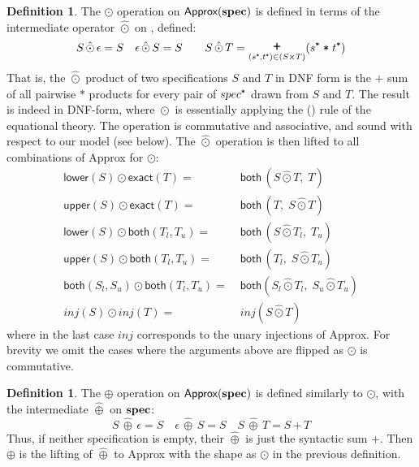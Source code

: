 \documentclass[10pt,preprint,numbers]{sigplanconf}
\newcounter{block}
\theoremstyle{definition}
\newtheorem{definition}[block]{Definition}
\newcommand{\term}[1]{\texttt{#1}}
\newcommand{\trule}[1]{{\footnotesize{(\text{#1})}}}
\begin{document}
\begin{definition} The $\odot$ operation on $\textsf{Approx}(\textbf{spec}{})$
  is defined in terms of the intermediate operator $\hat{\odot}$ on
  \specDNF{}, defined:
\begin{align*}
S \,\hat{\odot}\, \epsilon = S \quad
\epsilon \,\hat{\odot}\, S = S \qquad
S \,\hat{\odot}\, T = \bplus_{(\tyProd{s}, \tyProd{t}) \in (S \times
   T)} (\tyProd{s} \; \term{*} \; \tyProd{t})
\end{align*}
That is, the $\hat{\odot}$ product of two specifications $S$ and $T$ in DNF form
is the $\term{+}$ sum of all pairwise $\term{*}$ products for every
pair of $\tyProd{spec}$ drawn from $S$ and $T$. The result
is indeed in DNF-form, where $\hat{\odot}$ is essentially applying
 the \trule{\textsc{dist}} rule of the equational theory. The operation is
commutative and associative, and sound with respect to our
model (see  below).
The $\hat{\odot}$ operation is then lifted to all combinations of
\textsf{Approx} for $\odot$:
\begin{align*}
\textsf{lower}(S) \odot \textsf{exact}(T) = \; &
       \textsf{both} \, (S \hat{\odot} T, \; T) \\
\textsf{upper}(S) \odot \textsf{exact}(T) = \; &
       \textsf{both} \, (T, \; S \hat{\odot} T) \\
\textsf{lower}(S) \odot \textsf{both}(T_l,T_u) = \; &
        \textsf{both} \, (S \hat{\odot} T_l, \; T_u) \\
\textsf{upper}(S) \odot \textsf{both}(T_l,T_u) = \; & \textsf{both} \,
                                                      (T_l, \; S \hat{\odot} T_u) \\
\textsf{both}(S_l,S_u) \odot
\textsf{both}(T_l,T_u)  = \; & \textsf{both} (S_l \hat{\odot} T_l, \; S_u
                         \hat{\odot} T_u) \\
\textit{inj}(S) \odot \textit{inj}(T) = \; & \textit{inj}(S
                                              \hat{\odot} T)
\end{align*}
where in the last case $\textit{inj}$ corresponds to the unary
injections of \textsf{Approx}. For brevity we omit the cases where the arguments above are flipped
as $\odot$ is commutative.
\end{definition}

\begin{definition}The $\oplus$ operation on $\textsf{Approx}(\textbf{spec})$
is defined similarly to $\odot$, with the intermediate $\hat{\oplus}$ on
$\textbf{spec}$:
\begin{equation*}
S \,\hat{\oplus}\, \epsilon = S \quad
\epsilon \,\hat{\oplus}\, S = S \quad
S \, \hat{\oplus} \, T = S \, \term{+} \, T
\end{equation*}
Thus, if neither specification is empty, their $\hat{\oplus}$ is just
the syntactic sum $\term{+}$. Then $\oplus$ is the lifting of
$\hat{\oplus}$ to \textsf{Approx} with the shape as $\odot$ in the previous
definition.
\end{definition}
\end{document}
